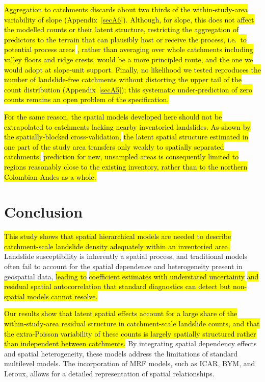 \documentclass[journal abbreviation, manuscript]{copernicus}
\newcommand{\hlE}[1]{{\sethlcolor{edcyan}\hl{#1}}}
\begin{document}
\hlE{Aggregation to catchments discards about two thirds of the within-study-area variability of slope (\mbox{Appendix~\ref{secA6}}). Although, for slope, this does not affect the modelled counts or their latent structure, restricting the aggregation of predictors to the terrain that can plausibly host or receive the process, i.e.~to potential process areas }\citep{steger2026dynamic}\hlE{, rather than averaging over whole catchments including valley floors and ridge crests, would be a more principled route, and the one we would adopt at slope-unit support. Finally, no likelihood we tested reproduces the number of landslide-free catchments without distorting the upper tail of the count distribution (\mbox{Appendix~\ref{secA5}}); this systematic under-prediction of zero counts remains an open problem of the specification.}

\hl{For the same reason, the spatial models developed here should not be extrapolated to catchments lacking nearby inventoried landslides. 
As shown by the spatially-blocked cross-validation,} \hlE{the latent spatial structure estimated in one part of the study area transfers only weakly to spatially separated catchments;} \hl{prediction for new, unsampled areas is consequently limited to regions reasonably close to the existing inventory, rather than to the northern Colombian Andes as a whole.}

\section{Conclusion}\label{sec6}

\hlE{This study shows that spatial hierarchical models are needed to describe catchment-scale landslide density adequately within an inventoried area.} 
Landslide susceptibility is inherently a spatial process, and traditional models often fail to account for the spatial dependence and heterogeneity present in geospatial data, \hl{leading to} \hlE{coefficient estimates with understated uncertainty} \hl{and residual spatial autocorrelation that standard diagnostics can detect but non-spatial models cannot resolve.}

\hlE{Our results show that latent spatial effects account for a large share of the within-study-area residual structure in catchment-scale landslide counts, and that the extra-Poisson variability of these counts is largely spatially structured rather than independent between catchments.} 
By integrating spatial dependency effects and spatial heterogeneity, these models address the limitations of standard multilevel models. 
The incorporation of MRF models, such as ICAR, BYM, and Leroux, allows for a detailed representation of spatial relationships.
\end{document}
